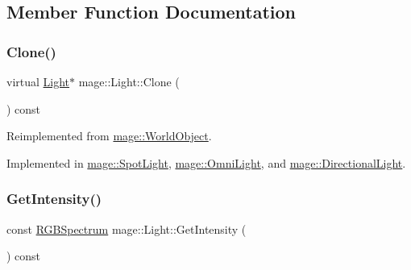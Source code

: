\subsection{Member Function Documentation}
\hypertarget{classmage_1_1_light_aada77583072dd108e5cf86257225b768}{}\label{classmage_1_1_light_aada77583072dd108e5cf86257225b768} 
\subsubsection{\texorpdfstring{Clone()}{Clone()}}
{\footnotesize\ttfamily virtual \hyperlink{classmage_1_1_light}{Light}$\ast$ mage\+::\+Light\+::\+Clone (\begin{DoxyParamCaption}{ }\end{DoxyParamCaption}) const\hspace{0.3cm}{\ttfamily [pure virtual]}}



Reimplemented from \hyperlink{classmage_1_1_world_object_a8793d22cb63b1bd31b1307e5e7094f61}{mage\+::\+World\+Object}.



Implemented in \hyperlink{classmage_1_1_spot_light_a3ec29a2a0edbd1f8fd7e76ba93d6c972}{mage\+::\+Spot\+Light}, \hyperlink{classmage_1_1_omni_light_a43f53b59b022ca6ab2d8b7646e644e15}{mage\+::\+Omni\+Light}, and \hyperlink{classmage_1_1_directional_light_a14e3816a550a992f1060de6da3b36dbf}{mage\+::\+Directional\+Light}.

\hypertarget{classmage_1_1_light_a344a6297a3933681cdc21bc5338a544c}{}\label{classmage_1_1_light_a344a6297a3933681cdc21bc5338a544c} 
\subsubsection{\texorpdfstring{Get\+Intensity()}{GetIntensity()}}
{\footnotesize\ttfamily const \hyperlink{structmage_1_1_r_g_b_spectrum}{R\+G\+B\+Spectrum} mage\+::\+Light\+::\+Get\+Intensity (\begin{DoxyParamCaption}{ }\end{DoxyParamCaption}) const}

\hypertarget{classmage_1_1_light_aa72536c3b0f41a6df91fbc7d0e724a9c}{}\label{classmage_1_1_light_aa72536c3b0f41a6df91fbc7d0e724a9c} 
